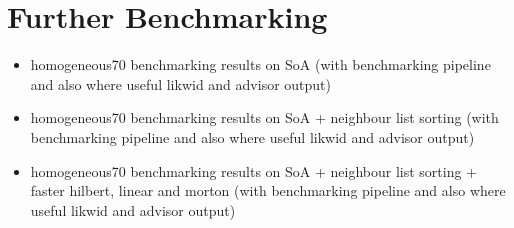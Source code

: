 \chapter{Further Benchmarking}
\label{ch:further_benchmarking}

\begin{itemize}
    \item homogeneous70 benchmarking results on SoA (with benchmarking pipeline and also where useful likwid and advisor output)
    \item homogeneous70 benchmarking results on SoA + neighbour list sorting (with benchmarking pipeline and also where useful likwid and advisor output)
    \item homogeneous70 benchmarking results on SoA + neighbour list sorting + faster hilbert, linear and morton (with benchmarking pipeline and also where useful likwid and advisor output)
\end{itemize}


